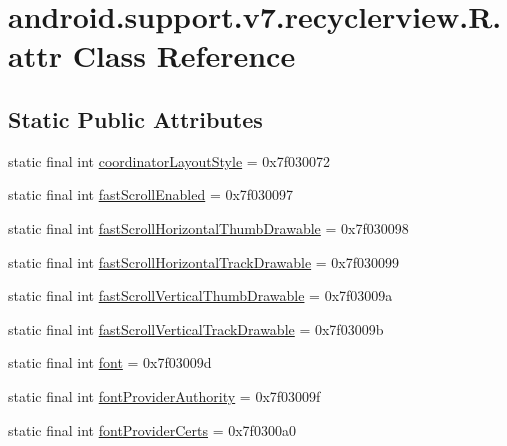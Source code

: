 \hypertarget{classandroid_1_1support_1_1v7_1_1recyclerview_1_1_r_1_1attr}{}\section{android.\+support.\+v7.\+recyclerview.\+R.\+attr Class Reference}
\label{classandroid_1_1support_1_1v7_1_1recyclerview_1_1_r_1_1attr}
\subsection*{Static Public Attributes}
\begin{DoxyCompactItemize}
\item 
static final int \mbox{\hyperlink{classandroid_1_1support_1_1v7_1_1recyclerview_1_1_r_1_1attr_a9b3aeb46114d924eb4cb7d78628268a6}{coordinator\+Layout\+Style}} = 0x7f030072
\item 
static final int \mbox{\hyperlink{classandroid_1_1support_1_1v7_1_1recyclerview_1_1_r_1_1attr_a5aa1b17458ce7df6b20a60420b248996}{fast\+Scroll\+Enabled}} = 0x7f030097
\item 
static final int \mbox{\hyperlink{classandroid_1_1support_1_1v7_1_1recyclerview_1_1_r_1_1attr_ab5805abff2c39da693b8f51fe01a1c42}{fast\+Scroll\+Horizontal\+Thumb\+Drawable}} = 0x7f030098
\item 
static final int \mbox{\hyperlink{classandroid_1_1support_1_1v7_1_1recyclerview_1_1_r_1_1attr_a0181829d24eed87b2e10e67e627df712}{fast\+Scroll\+Horizontal\+Track\+Drawable}} = 0x7f030099
\item 
static final int \mbox{\hyperlink{classandroid_1_1support_1_1v7_1_1recyclerview_1_1_r_1_1attr_ab4defa9597fea23f65beb632b6db4256}{fast\+Scroll\+Vertical\+Thumb\+Drawable}} = 0x7f03009a
\item 
static final int \mbox{\hyperlink{classandroid_1_1support_1_1v7_1_1recyclerview_1_1_r_1_1attr_aafd1b486cccc20ce9c848296759844d1}{fast\+Scroll\+Vertical\+Track\+Drawable}} = 0x7f03009b
\item 
static final int \mbox{\hyperlink{classandroid_1_1support_1_1v7_1_1recyclerview_1_1_r_1_1attr_a2a2dcc2e610d2eb4f755722569bd6d72}{font}} = 0x7f03009d
\item 
static final int \mbox{\hyperlink{classandroid_1_1support_1_1v7_1_1recyclerview_1_1_r_1_1attr_ad1ecdf7f8385b4cc50743811e55e5645}{font\+Provider\+Authority}} = 0x7f03009f
\item 
static final int \mbox{\hyperlink{classandroid_1_1support_1_1v7_1_1recyclerview_1_1_r_1_1attr_a2b16bc45eb8d6fc743a3cf5d44946c91}{font\+Provider\+Certs}} = 0x7f0300a0

\end{DoxyCompactItemize}
